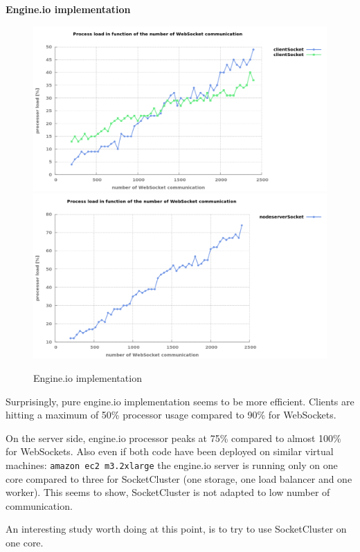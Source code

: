 \textbf{Engine.io implementation}
\begin{figure}[H]
	\centering
		\includegraphics[width=\textwidth]{./Figures/engine_client_comparaison.png}
		\includegraphics[width=\textwidth]{./Figures/engine_server_comparaison.png}
	\caption[Engine.io implementation]{Engine.io implementation}
	\label{fig:engine_comparaison}
\end{figure}

Surprisingly, pure engine.io implementation seems to be more efficient. Clients
are hitting a maximum of 50\% processor usage compared to 90\% for WebSockets.

On the server side, engine.io processor peaks at 75\% compared to almost
100\% for WebSockets. Also even if both code have been deployed on similar
virtual machines: \texttt{amazon ec2 m3.2xlarge} the engine.io server is
running only on one core compared to three for SocketCluster (one storage,
one load balancer and one worker). This seems to show, SocketCluster is not
adapted to low number of communication.

An interesting study worth doing at this point, is to try to use
SocketCluster on one core.

